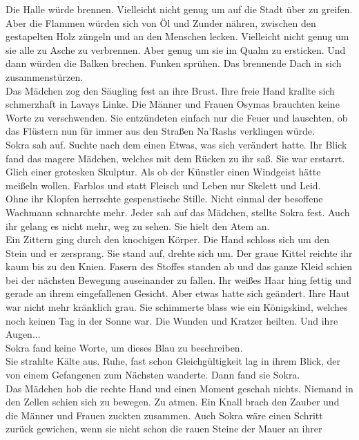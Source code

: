 Die Halle würde brennen. Vielleicht nicht genug um auf die Stadt über zu greifen. Aber die Flammen 
würden sich von Öl und Zunder nähren, zwischen den gestapelten Holz züngeln und an den Menschen 
lecken. Vielleicht nicht genug um sie alle zu Asche zu verbrennen. Aber genug um sie im Qualm zu 
ersticken. Und dann würden die Balken brechen. Funken sprühen. Das brennende Dach in sich 
zusammenstürzen.\\
Das Mädchen zog den Säugling fest an ihre Brust. Ihre freie Hand krallte sich schmerzhaft in Lavays 
Linke. Die Männer und Frauen Osymas brauchten keine Worte zu verschwenden. Sie entzündeten 
einfach nur die Feuer und lauschten, ob das Flüstern nun für immer aus den Straßen Na'Rashs 
verklingen würde.\\

Sokra sah auf. Suchte nach dem einen Etwas, was sich verändert hatte. Ihr Blick fand das magere 
Mädchen, welches mit dem Rücken zu ihr saß. Sie war erstarrt. Glich einer grotesken Skulptur. Als ob 
der Künstler einen Windgeist hätte meißeln wollen. Farblos und statt Fleisch und Leben nur Skelett 
und Leid.\\
Ohne ihr Klopfen herrschte gespenstische Stille. Nicht einmal der besoffene Wachmann schnarchte 
mehr. Jeder sah auf das Mädchen, stellte Sokra fest. Auch ihr gelang es nicht mehr, weg zu sehen. 
Sie hielt den Atem an.\\
Ein Zittern ging durch den knochigen Körper. Die Hand schloss sich um den Stein und er zersprang. 
Sie stand auf, drehte sich um. Der graue Kittel reichte ihr kaum bis zu den Knien. Fasern des 
Stoffes standen ab und das ganze Kleid schien bei der nächsten Bewegung auseinander zu fallen. Ihr 
weißes Haar hing fettig und gerade an ihrem eingefallenen Gesicht. Aber etwas hatte sich geändert. 
Ihre Haut war nicht mehr kränklich grau. Sie schimmerte blass wie ein Königskind, welches noch 
keinen Tag in der Sonne war. Die Wunden und Kratzer heilten. Und ihre Augen...\\
Sokra fand keine Worte, um dieses Blau zu beschreiben.\\
Sie strahlte Kälte aus. Ruhe, fast schon Gleichgültigkeit lag in ihrem Blick, der von einem 
Gefangenen zum Nächsten wanderte. Dann fand sie Sokra.\\
Das Mädchen hob die rechte Hand und einen Moment geschah nichts. Niemand in den Zellen schien sich 
zu bewegen. Zu atmen. Ein Knall brach den Zauber und die Männer und Frauen zuckten zusammen. Auch 
Sokra wäre einen Schritt zurück gewichen, wenn sie nicht schon die rauen Steine der Mauer an ihrer 
